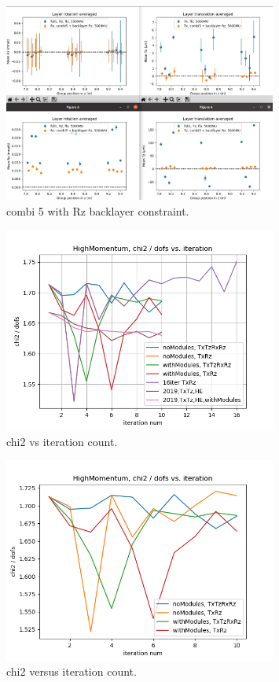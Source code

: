 \begin{figure}
  \centering
  \includegraphics[width=0.8\textwidth]{plots/oct_6/combi5_added_RZ_backlayer.png}
  \caption{combi 5 with Rz backlayer constraint.}
  \label{fig:oct6}
\end{figure}

\begin{figure}
  \centering
  \includegraphics[width=0.8\textwidth]{plots/nov_19/Figure_2.png}
  \caption{chi2 vs iteration count.}
  \label{fig:fig2}
\end{figure}

\begin{figure}
  \centering
  \includegraphics[width=0.8\textwidth]{plots/nov_21/chi2_vs_iter_all.png}
  \caption{chi2 versus iteration count.}
  \label{fig:chi2iter}
\end{figure}

